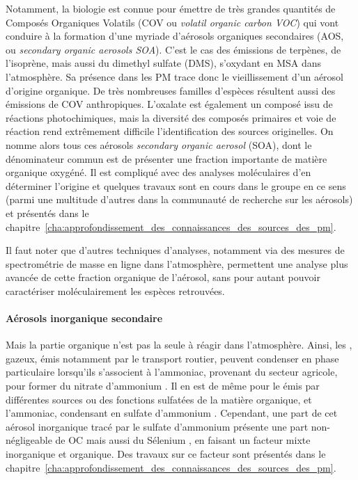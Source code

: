 Notamment, la biologie est connue pour émettre de très grandes quantités de Composés
Organiques Volatils (COV ou \textit{volatil organic carbon VOC}) qui vont conduire à la
formation d'une myriade d'aérosols organiques secondaires (AOS, ou \textit{secondary
organic aerosols SOA}). C'est le cas des émissions de terpènes, de l'isoprène,
mais aussi du dimethyl sulfate (DMS), s'oxydant en
MSA dans l'atmosphère. Sa présence dans les PM trace donc le vieillissement d'un aérosol
d'origine organique. De très nombreuses familles d'espèces résultent aussi des émissions
de COV anthropiques.  
L'oxalate est également un composé issu de réactions photochimiques,
mais la diversité des composés primaires et voie de réaction rend extrêmement difficile
l'identification des sources originelles.
On nomme alors tous ces aérosols \textit{secondary organic aerosol} (SOA), dont le
dénominateur commun est de présenter une fraction importante de matière organique
oxygéné. Il est compliqué avec des analyses moléculaires d'en déterminer l'origine et
quelques travaux sont en cours dans le groupe en ce sens (parmi une multitude d'autres
dans la communauté de recherche sur les aérosols) et présentés dans le
chapitre~\ref{cha:approfondissement_des_connaissances_des_sources_des_pm}.

Il faut noter que d'autres techniques d'analyses, notamment via des mesures de
spectrométrie de masse en ligne dans l'atmosphère, permettent une
analyse plus avancée de cette fraction organique de l'aérosol, sans pour autant pouvoir
caractériser moléculairement les espèces retrouvées.

\paragraph{Aérosols inorganique secondaire}%
\label{par:aérosols_inorganique_secondaire}

Mais la partie organique n'est pas la seule à réagir dans l'atmosphère. Ainsi, les
, gazeux, émis notamment par le transport routier, peuvent condenser en phase
particulaire lorsqu'ils s'associent à l'ammoniac, provenant du secteur agricole, pour
former du nitrate d'ammonium . Il en est de même pour le  émis par
différentes sources ou des fonctions sulfatées de la matière organique, et l'ammoniac,
condensant en sulfate d'ammonium . Cependant, une part de cet aérosol
inorganique tracé par le sulfate d'ammonium présente une part non-négligeable de OC mais
aussi du Sélenium , en faisant un facteur mixte inorganique et organique. Des travaux
sur ce facteur sont présentés dans le
chapitre~\ref{cha:approfondissement_des_connaissances_des_sources_des_pm}.

